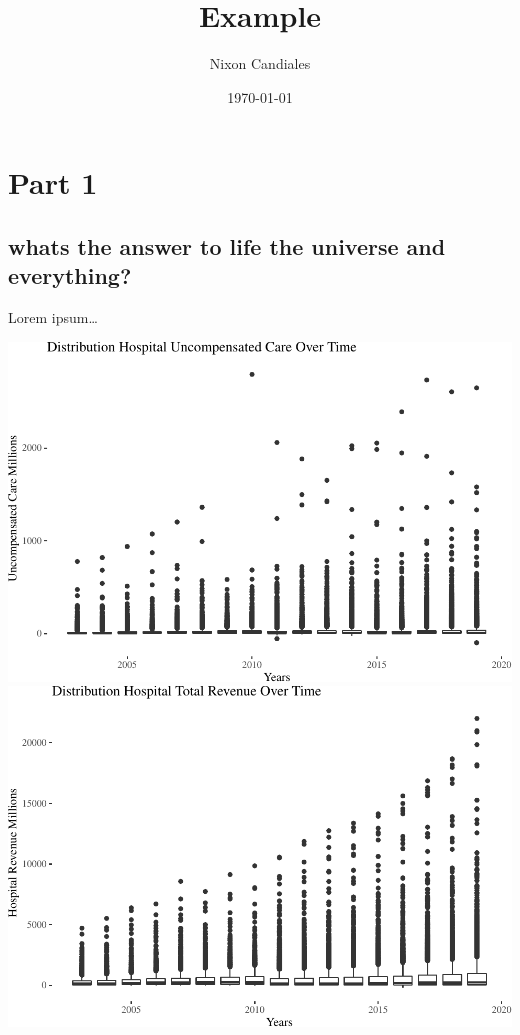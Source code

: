 \documentclass[
]{article}
\title{Example}
\author{Nixon Candiales}
\date{\today}
\begin{document}
\maketitle

\hypertarget{part-1}{%
\section{Part 1}\label{part-1}}

\hypertarget{whats-the-answer-to-life-the-universe-and-everything}{%
\subsection{whats the answer to life the universe and
everything?}\label{whats-the-answer-to-life-the-universe-and-everything}}

Lorem ipsum\ldots{}

\includegraphics{Report_files/figure-latex/Figures-1.pdf}
\includegraphics{Report_files/figure-latex/Figures-2.pdf}
\end{document}
